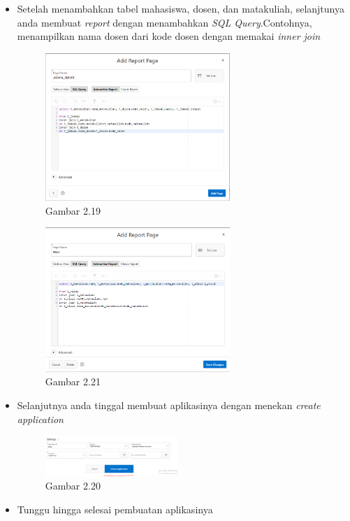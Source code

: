 \documentclass{article}
\begin{document}
\begin{itemize}
            \item Setelah menambahkan tabel mahasiswa, dosen, dan matakuliah, selanjtunya anda membuat \textit{report} dengan menambahkan \textit{SQL Query}.Contohnya, menampilkan nama dosen dari kode dosen dengan memakai \textit{inner join} 
                \begin{figure}[ht]
                    \centerline{\includegraphics[width=7cm]{reportjadwal.PNG}}
                    \caption{Gambar 2.19}
                \end{figure}
                \begin{figure}[ht]
                    \centerline{\includegraphics[width=7cm]{reportnilai.PNG}}
                    \caption{Gambar 2.21}
                \end{figure}
            \item Selanjutnya anda tinggal membuat aplikasinya dengan menekan \textit{create application}
                \begin{figure}[ht]
                    \centerline{\includegraphics[width=5cm]{Capture21.PNG}}
                    \caption{Gambar 2.20}
                \end{figure}
            \item Tunggu hingga selesai pembuatan aplikasinya

\end{itemize}
\end{document}

